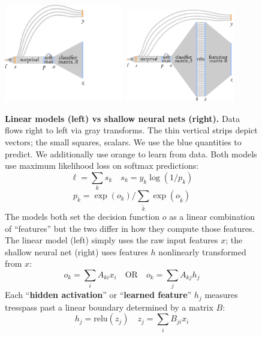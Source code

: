 \documentclass[11pt, justified]{tufte-book}
\theoremstyle{definition}
\begin{document}
        \begin{figure}[h]
          \centering
            \includegraphics[width=0.468\textwidth]{linear}
            \includegraphics[width=0.423\textwidth]{shallow}
          \caption{%
            \textbf{Linear models (left) vs shallow neural nets (right).}
            Data flows right to left via {\gre gray} transforms.  The thin
            vertical strips depict vectors; the small squares, scalars.  We use
            the {\blu blue} quantities to predict.  We additionally use
            {\color{orange} orange} to learn from data.
            Both models use maximum likelihood loss on softmax
            predictions:\vspace{-0.1cm}
            $$
                \ell = \textstyle\sum_k s_k 
                \quad
                s_k = y_k \log(1/p_k)
            $$
            \vspace{-0.4cm}
            $$
                p_k = \exp(o_k) /\!\textstyle\sum_{\tilde k} \exp(o_{\tilde k})
            $$
            The models both set the decision function $o$ as a linear
            combination of ``features'' but the two differ in how they compute
            those features.  The linear model (left) simply uses the raw input
            features $x$; the shallow neural net (right) uses features $h$
            nonlinearly transformed from $x$:\vspace{-0.1cm}
            $$
                o_k = \textstyle\sum_{i} A_{ki} x_i 
                \quad
                \text{OR}
                \quad
                o_k = \textstyle\sum_{j} A_{kj} h_j 
            $$
            Each ``\textbf{hidden activation}'' or 
            ``\textbf{learned feature}'' $h_j$ measures tresspass past a linear
            boundary determined by a matrix $B$:\vspace{-0.1cm}
            $$
                h_j = \text{relu}(z_j)
                \quad
                z_j = \textstyle\sum_{i} B_{ji} x_i 
            $$
          }
        \end{figure}
\end{document}
